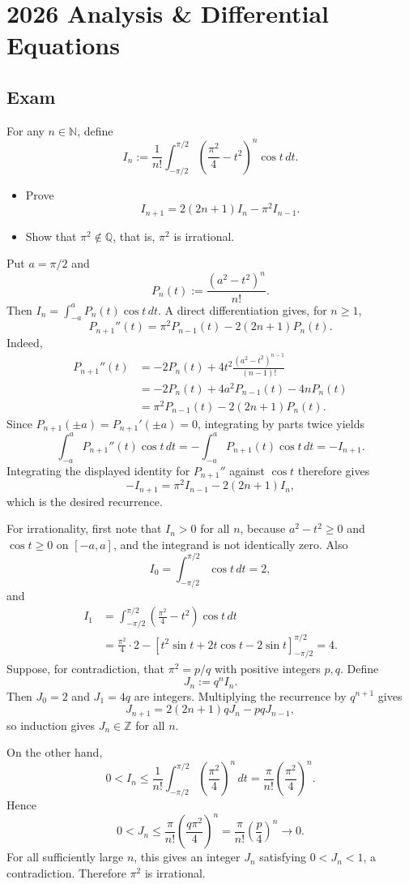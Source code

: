 \section{2026 Analysis \& Differential Equations}

\subsection{Exam}

\begin{exercise}
\label{analysis:2026:1}
For any $n\in\mathbb{N}$, define
\[
I_n:=\frac{1}{n!}\int_{-\pi/2}^{\pi/2}\left(\frac{\pi^2}{4}-t^2\right)^n\cos t\,dt.
\]
\begin{itemize}
\item[(a)] Prove
\[
I_{n+1}=2(2n+1)I_n-\pi^2I_{n-1}.
\]
\item[(b)] Show that $\pi^2\notin\mathbb{Q}$, that is, $\pi^2$ is irrational.
\end{itemize}
\end{exercise}

\begin{solution}
Put $a=\pi/2$ and
\[
P_n(t):=\frac{(a^2-t^2)^n}{n!}.
\]
Then $I_n=\int_{-a}^a P_n(t)\cos t\,dt$.  A direct differentiation gives, for $n\geq 1$,
\[
P_{n+1}''(t)
=\pi^2P_{n-1}(t)-2(2n+1)P_n(t).
\]
Indeed,
\[
\begin{aligned}
P_{n+1}''(t)
&=-2P_n(t)+4t^2\frac{(a^2-t^2)^{n-1}}{(n-1)!}  \\
&=-2P_n(t)+4a^2P_{n-1}(t)-4nP_n(t) \\
&=\pi^2P_{n-1}(t)-2(2n+1)P_n(t).
\end{aligned}
\]
Since $P_{n+1}(\pm a)=P_{n+1}'(\pm a)=0$, integrating by parts twice yields
\[
\int_{-a}^a P_{n+1}''(t)\cos t\,dt
=-\int_{-a}^a P_{n+1}(t)\cos t\,dt
=-I_{n+1}.
\]
Integrating the displayed identity for $P_{n+1}''$ against $\cos t$ therefore gives
\[
-I_{n+1}=\pi^2I_{n-1}-2(2n+1)I_n,
\]
which is the desired recurrence.

For irrationality, first note that $I_n>0$ for all $n$, because
$a^2-t^2\geq 0$ and $\cos t\geq 0$ on $[-a,a]$, and the integrand is not identically zero.  Also
\[
I_0=\int_{-\pi/2}^{\pi/2}\cos t\,dt=2,
\]
and
\[
\begin{aligned}
I_1
&=\int_{-\pi/2}^{\pi/2}\left(\frac{\pi^2}{4}-t^2\right)\cos t\,dt \\
&=\frac{\pi^2}{4}\cdot 2-\left[t^2\sin t+2t\cos t-2\sin t\right]_{-\pi/2}^{\pi/2}
=4.
\end{aligned}
\]
Suppose, for contradiction, that $\pi^2=p/q$ with positive integers $p,q$.  Define
\[
J_n:=q^n I_n.
\]
Then $J_0=2$ and $J_1=4q$ are integers.  Multiplying the recurrence by $q^{n+1}$ gives
\[
J_{n+1}=2(2n+1)qJ_n-pqJ_{n-1},
\]
so induction gives $J_n\in\mathbb{Z}$ for all $n$.

On the other hand,
\[
0<I_n
\leq \frac{1}{n!}\int_{-\pi/2}^{\pi/2}\left(\frac{\pi^2}{4}\right)^n\,dt
=\frac{\pi}{n!}\left(\frac{\pi^2}{4}\right)^n.
\]
Hence
\[
0<J_n
\leq \frac{\pi}{n!}\left(\frac{q\pi^2}{4}\right)^n
=\frac{\pi}{n!}\left(\frac{p}{4}\right)^n
\longrightarrow 0.
\]
For all sufficiently large $n$, this gives an integer $J_n$ satisfying $0<J_n<1$, a contradiction.  Therefore $\pi^2$ is irrational.
\end{solution}

